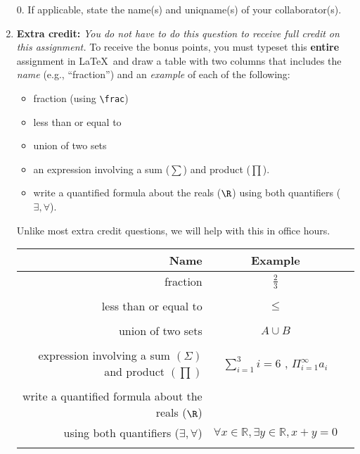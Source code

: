 \documentclass[11pt]{exam}
\begin{document}
\hwpreface

\begin{enumerate}
    \item[0.] If applicable, state the name(s) and uniqname(s) of your collaborator(s).
    \begin{solution}

    \end{solution}

  \item \textbf{Extra credit:} {\it You do not have to do this question to receive full credit on this assignment.} To receive the bonus points, you must typeset this \textbf{entire} assignment in \LaTeX ~and draw a table with two columns
    that includes the \emph{name} (e.g., ``fraction'')
    and an \emph{example} of each of the following:
		\begin{itemize}
            \item fraction (using \texttt{\textbackslash frac})
			\item less than or equal to
			\item union of two sets
			\item an expression involving a sum ($\sum$) and product ($\prod$).
            \item write a quantified formula about the reals ($\R$) using both quantifiers ($\exists,\forall$).
		\end{itemize}
		Unlike most extra credit questions, we will help with this in office hours.
		
    \begin{solution}
\begin{tabular}{r|cl}
Name & Example\\
\hline
fraction & $\frac{2}{3}$ \\ \\
less than or equal to & $\leq$ \\ \\
union of two sets & $A \cup B$ \\ \\
expression involving a sum $(\Sigma)$ and product $(\prod)$ &  $\sum_{i=1}^3 i = 6$ , $ \Pi_{i=1}^\infty a_i  $ \\ \\
write a quantified formula about the reals ($\R$) \\ using both quantifiers ($\exists,\forall$) & $\forall x \in \mathbb{R}, \exists y \in \mathbb{R}, x + y = 0$\\ \\
\end{tabular}
    \end{solution}


\end{enumerate}
\end{document}
